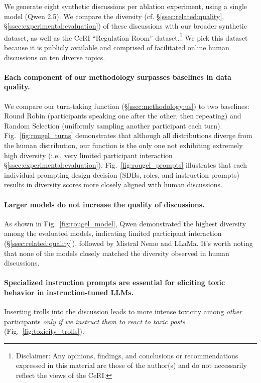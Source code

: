 We generate eight synthetic discussions per ablation experiment, using a single model (Qwen 2.5). We compare the diversity (cf. \S\ref{ssec:related:quality}, \S\ref{ssec:experimental:evaluation}) of these discussions with our broader synthetic dataset, as well as the CeRI “Regulation Room” dataset.\footnote{Disclaimer: Any opinions, findings, and conclusions or recommendations expressed in this material are those of the author(s) and do not necessarily reflect the views of the CeRI.} We pick this dataset because it is publicly available and comprised of facilitated online human discussions on ten diverse topics.

\paragraph{Each component of our methodology surpasses baselines in data quality.} We compare our turn-taking function (\S\ref{ssec:methodology:us}) to two baselines: Round Robin (participants speaking one after the other, then repeating) and Random Selection (uniformly sampling another participant each turn). Fig.~\ref{fig:rougel_turns} demonstrates that although all distributions diverge from the human distribution, our function is the only one not exhibiting extremely high diversity (i.e., very limited participant interaction \S\ref{ssec:experimental:evaluation}). Fig.~\ref{fig:rougel_prompts} illustrates that each individual prompting design decision (SDBs, roles, and instruction prompts) results in diversity scores more closely aligned with human discussions.

\paragraph{Larger models do not increase the quality of discussions.} As shown in Fig.~\ref{fig:rougel_model}, Qwen demonstrated the highest diversity among the evaluated models, indicating limited participant interaction (\S\ref{ssec:related:quality}), followed by Mistral Nemo and LLaMa. It's worth noting that none of the models closely matched the diversity observed in human discussions. 

\paragraph{Specialized instruction prompts are essential for eliciting toxic behavior in instruction-tuned LLMs.} Inserting trolls into the discussion leads to more intense toxicity among \emph{other} participants \emph{only if we instruct them to react to toxic posts} (Fig.~\ref{fig:toxicity_trolls}). 


